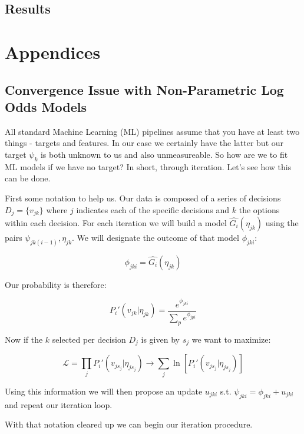 \documentclass[11pt]{article}
\begin{document}
\subsection{Results}














\newpage
\section{Appendices}

\subsection{Convergence Issue with Non-Parametric Log Odds Models} \label{convergence issues}

All standard Machine Learning (ML) pipelines assume that you have at least two things - targets and features. In our case we certainly have the latter but our target $\psi_k$ is both unknown to us and also unmeasureable. So how are we to fit ML models if we have no target? In short, through iteration. Let's see how this can be done.\newline

First some notation to help us. Our data is composed of a series of decisions $D_j=\lbrace v_{jk} \rbrace$ where $j$ indicates each of the specific decisions and $k$ the options within each decision. For each iteration we will build a model $\hat{G_i}(\eta_{jk})$ using the pairs $\psi_{jk(i-1)},\eta_{jk}$. We will designate the outcome of that model $\phi_{jki}$:

$$\phi_{jki} = \hat{G_i}(\eta_{jk})$$

Our probability is therefore:

$$P_i'(v_{jk}|\eta_{jk})=\frac{e^{\phi_{jki}}}{\sum_p e^{\phi_{jpi}}}$$

Now if the $k$ selected per decision $D_j$ is given by $s_j$ we want to maximize:

$$\mathcal{L}=\prod_j P_i'(v_{js_j} | \eta_{js_j})\rightarrow \sum_j \ln{\left[ P_i'(v_{js_j} | \eta_{js_j}) \right]}$$

Using this information we will then propose an update $u_{jki}$ s.t. $\psi_{jki}=\phi_{jki} + u_{jki}$ and repeat our iteration loop. 

With that notation cleared up we can begin our iteration procedure. \newline
\end{document}
